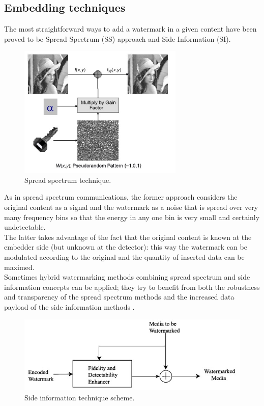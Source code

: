 \subsection{Embedding techniques}
The most straightforward ways to add a watermark in a given content have been proved to be Spread Spectrum (SS) approach and Side Information (SI).\\
\begin{figure}[h!]
\centering
\includegraphics[width=0.7\textwidth]{./img/ss.jpg}
\caption{\small{Spread spectrum technique.}}
\label{fig:ss}
\end{figure}
As in spread spectrum communications, the former approach considers the original content as a signal and the watermark as a noise that is spread over very many frequency bins so that the energy in any one bin is very small and certainly undetectable\cite{COX}\cite{COX1}.\\
The latter takes advantage of the fact that the original content is known at the embedder side (but unknown at the detector): this way the watermark can be modulated  according to the original and the quantity of inserted data can be maximed\cite{COX1,SH, EG, COSTA}.\\

Sometimes hybrid watermarking methods combining spread spectrum and side information concepts can be applied; they try to benefit from both the robustness and transparency of the spread spectrum methods and the increased data payload of the side information methods \cite{QIM}\cite{QIM1}.
\begin{figure}[h!]
\centering
\includegraphics[width=1\textwidth]{./img/si.jpg}
\caption{\small{Side information technique scheme.}}
\label{fig:si}
\end{figure}

